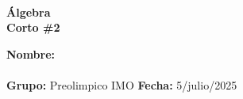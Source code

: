\begin{center}
    \ \\
    \vspace{-1mm}
    \textbf{\Large Álgebra \\ \vspace{2mm}Corto \#2}
\end{center}
\vspace{6mm}
\textbf{Nombre:} \hrulefill\\
\vspace{-2mm}\\
\textbf{Grupo:} Preolimpico IMO \hfill \textbf{Fecha:} 5/julio/2025\\
\vspace{-8mm}
\thispagestyle{first-page-style}